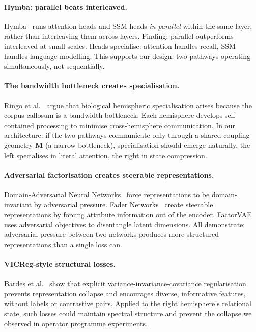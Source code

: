 \documentclass[11pt, a4paper]{article}
\newcommand{\M}{\mathbf{M}}
\theoremstyle{plain}
\theoremstyle{definition}
\theoremstyle{remark}
\begin{document}
\paragraph{Hymba: parallel beats interleaved.}
Hymba~\cite{nvidia2024hymba} runs attention heads and SSM heads \emph{in parallel} within the same layer, rather than interleaving them across layers.
Finding: parallel outperforms interleaved at small scales.
Heads specialise: attention handles recall, SSM handles language modelling.
This supports our design: two pathways operating simultaneously, not sequentially.

\paragraph{The bandwidth bottleneck creates specialisation.}
Ringo et al.~\cite{ringo1994hemispheric} argue that biological hemispheric specialisation arises because the corpus callosum is a bandwidth bottleneck.
Each hemisphere develops self-contained processing to minimise cross-hemisphere communication.
In our architecture: if the two pathways communicate only through a shared coupling geometry $\M$ (a narrow bottleneck), specialisation should emerge naturally, the left specialises in literal attention, the right in state compression.

\paragraph{Adversarial factorisation creates steerable representations.}
Domain-Adversarial Neural Networks~\cite{ganin2016dann} force representations to be domain-invariant by adversarial pressure.
Fader Networks~\cite{lample2017fader} create steerable representations by forcing attribute information out of the encoder.
FactorVAE~\cite{kim2018factorizing} uses adversarial objectives to disentangle latent dimensions.
All demonstrate: adversarial pressure between two networks produces more structured representations than a single loss can.

\paragraph{VICReg-style structural losses.}
Bardes et al.~\cite{bardes2022vicreg} show that explicit variance-invariance-covariance regularisation prevents representation collapse and encourages diverse, informative features, without labels or contrastive pairs.
Applied to the right hemisphere's relational state, such losses could maintain spectral structure and prevent the collapse we observed in operator programme experiments.
\end{document}
